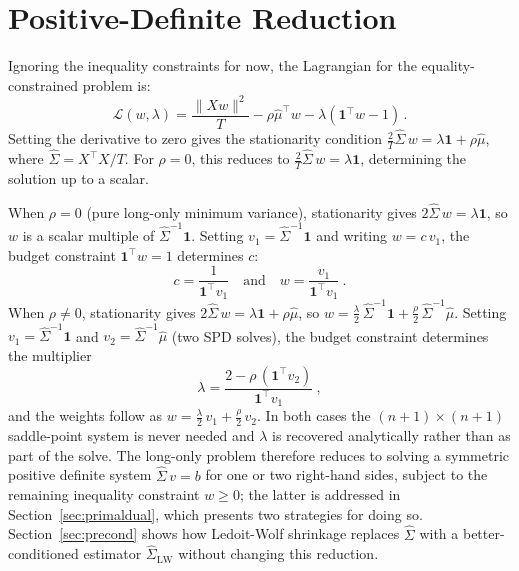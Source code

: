 \section{Positive-Definite Reduction}\label{sec:pd}

Ignoring the inequality constraints for now, the Lagrangian for the equality-constrained problem is:
\[
\mathcal{L}(w, \lambda) = \frac{\|Xw\|^2}{T} - \rho\hat\mu^\top w - \lambda(\mathbf{1}^\top w - 1)\,.
\]
Setting the derivative to zero gives the stationarity condition
$\frac{2}{T}\hat\Sigma\, w = \lambda \mathbf{1} + \rho\hat \mu$, where $\hat\Sigma = X^\top X/T$.
For $\rho = 0$, this reduces to $\frac{2}{T}\hat\Sigma\, w = \lambda\mathbf{1}$, determining the solution up to a scalar.

When $\rho = 0$ (pure long-only minimum variance), stationarity gives $2\hat\Sigma\, w = \lambda\mathbf{1}$,
so $w$ is a scalar multiple of $\hat\Sigma^{-1}\mathbf{1}$.
Setting $v_1 = \hat\Sigma^{-1}\mathbf{1}$ and writing $w = c\,v_1$, the budget constraint
$\mathbf{1}^\top w = 1$ determines $c$:
\[
  c = \frac{1}{\mathbf{1}^\top v_1} \quad \mbox{and} \quad w = \frac{v_1}{\mathbf{1}^\top v_1}~.
\]
When $\rho \neq 0$, stationarity gives $2\hat\Sigma\, w = \lambda\mathbf{1} + \rho\hat \mu$, so
$w = \tfrac{\lambda}{2}\,\hat\Sigma^{-1}\mathbf{1} + \tfrac{\rho}{2}\,\hat\Sigma^{-1}\hat \mu$.
Setting $v_1 = \hat\Sigma^{-1}\mathbf{1}$ and $v_2 = \hat\Sigma^{-1}\hat \mu$ (two SPD solves), the budget
constraint determines the multiplier
\[
  \lambda = \frac{2 - \rho\,(\mathbf{1}^\top v_2)}{\mathbf{1}^\top v_1}~,
\]
and the weights follow as $w = \tfrac{\lambda}{2}\,v_1 + \tfrac{\rho}{2}\,v_2$.
In both cases the $(n+1)\times(n+1)$ saddle-point system is never needed and $\lambda$ is
recovered analytically rather than as part of the solve.
The long-only problem therefore reduces to solving a symmetric positive definite system
$\hat\Sigma\,v = b$ for one or two right-hand sides, subject to the remaining inequality
constraint $w \geq 0$; the latter is addressed in Section~\ref{sec:primaldual}, which
presents two strategies for doing so. Section~\ref{sec:precond} shows how Ledoit-Wolf
shrinkage replaces $\hat\Sigma$ with a better-conditioned estimator $\hat\Sigma_{\mathrm{LW}}$
without changing this reduction.
